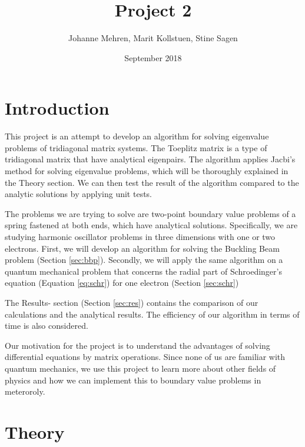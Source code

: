 \documentclass{article}
\title{Project 2}
\author{Johanne Mehren, Marit Kollstuen, Stine Sagen}
\date{September 2018}
\begin{document}
\maketitle

\begin{abstract}
    
\end{abstract}


\section{Introduction}

This project is an attempt to develop an algorithm for solving eigenvalue problems of tridiagonal matrix systems. The Toeplitz matrix is a type of tridiagonal matrix that have analytical eigenpairs. The algorithm applies Jacbi's method for solving eigenvalue problems, which will be thoroughly explained in the Theory section. We can then test the result of the algorithm compared to the analytic solutions by applying unit tests.

\medskip

The problems we are trying to solve are two-point boundary value problems of a spring fastened at both ends, which have analytical solutions. Specifically, we are studying harmonic oscillator problems in three dimensions with one or two electrons. First, we will develop an algorithm for solving the Buckling Beam problem (Section \ref{sec:bbp}). Secondly, we will apply the same algorithm on a quantum mechanical problem that concerns the radial part of Schroedinger's equation (Equation \ref{eq:schr}) for one electron (Section \ref{sec:schr})

\medskip

The Results- section (Section \ref{sec:res}) contains the comparison of our calculations and the analytical results. The efficiency of our algorithm in terms of time is also considered. 

\medskip

Our motivation for the project is to understand the advantages of solving differential equations by matrix operations. Since none of us are familiar with quantum mechanics, we use this project to learn more about other fields of physics and how we can implement this to boundary value problems in meteroroly. 

\section{Theory}
\end{document}
